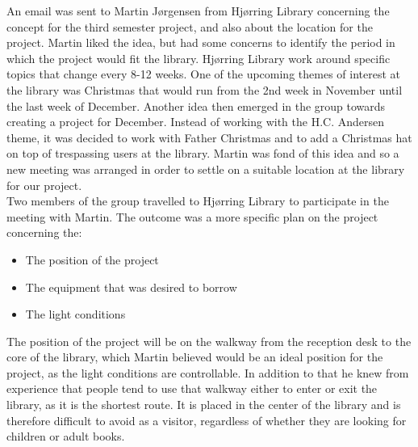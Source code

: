 An email was sent to Martin Jørgensen from Hjørring Library concerning the concept for the third semester project, and also about the location for the project. Martin liked the idea, but had some concerns to identify the period in which the project would fit the library. Hjørring Library work around specific topics that change every 8-12 weeks. One of the upcoming themes of interest at the library was Christmas that would run from the 2nd week in November until the last week of December. Another idea then emerged in the group towards creating a project for December. Instead of working with the H.C. Andersen theme, it was decided to work with Father Christmas and to add a Christmas hat on top of trespassing users at the library. Martin was fond of this idea and so a new meeting was arranged in order to settle on a suitable location at the library for our project.\\
Two members of the group travelled to Hjørring Library to participate in the meeting with Martin. The outcome was a more specific plan on the project concerning the:

\begin{itemize}
\item The position of the project
\item The equipment that was desired to borrow
\item The light conditions
\end{itemize}

The position of the project will be on the walkway from the reception desk to the core of the library, which Martin believed would be an ideal position for the project, as the light conditions are controllable. In addition to that he knew from experience that people tend to use that walkway either to enter or exit the library, as it is the shortest route. It is placed in the center of the library and is therefore difficult to avoid as a visitor, regardless of whether they are looking for children or adult books.

